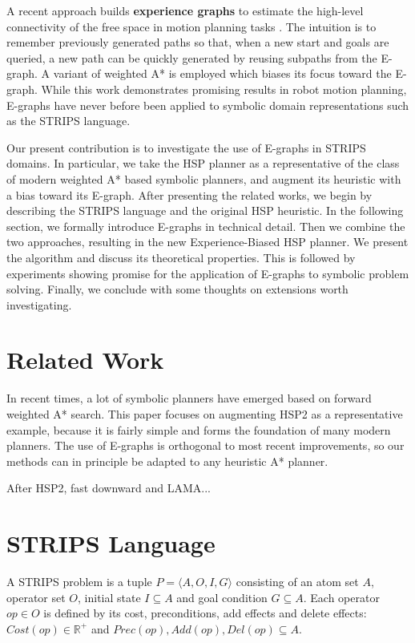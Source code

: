 \documentclass[letterpaper]{article}
\begin{document}
A recent approach builds \textbf{experience graphs} to estimate the high-level connectivity of the free space in motion planning tasks \cite{phillips2012graphs}.
The intuition is to remember previously generated paths so that, when a new start and goals are queried, a new path can be quickly generated by reusing subpaths from the E-graph.
A variant of weighted A* is employed which biases its focus toward the E-graph.
While this work demonstrates promising results in robot motion planning, E-graphs have never before been applied to symbolic domain representations such as the STRIPS language.

Our present contribution is to investigate the use of E-graphs in STRIPS domains. In particular, we take the HSP planner \cite{bonet2001planning} as a representative of the class of modern weighted A* based symbolic planners, and augment its heuristic with a bias toward its E-graph. After presenting the related works, we begin by describing the STRIPS language and the original HSP heuristic. In the following section, we formally introduce E-graphs in technical detail. Then we combine the two approaches, resulting in the new Experience-Biased HSP planner. We present the algorithm and discuss its theoretical properties. This is followed by experiments showing promise for the application of E-graphs to symbolic problem solving. Finally, we conclude with some thoughts on extensions worth investigating.

\section{Related Work}

In recent times, a lot of symbolic planners have emerged based on forward weighted A* search. This paper focuses on augmenting HSP2 as a representative example, because it is fairly simple and forms the foundation of many modern planners. The use of E-graphs is orthogonal to most recent improvements, so our methods can in principle be adapted to any heuristic A* planner.

After HSP2, fast downward and LAMA...

\section{STRIPS Language}

A STRIPS problem is a tuple $P = \langle A,O,I,G\rangle$ consisting of an atom set $A$, operator set $O$, initial state $I \subseteq A$ and goal condition $G \subseteq A$.
Each operator $op\in O$ is defined by its cost, preconditions, add effects and delete effects: $Cost(op) \in \mathbb{R}^+$ and $Prec(op),Add(op),Del(op) \subseteq A$.
\end{document}
